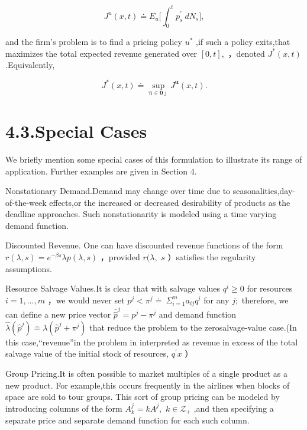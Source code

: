 \[
J ^ { u } ( x , t ) \doteq E _ { u } \biggl [ \int _ { 0 } ^ { t } p _ { s } ^ { \prime } \ d N _ { s } \biggl ] ,
\]

and the firm's problem is to find a pricing policy \(u ^ { * }\) ,if
such a policy exits,that maximizes the total expected revenue generated
over \([ 0 , t ] ,\) ，denoted \(J ^ { * } ( x , t )\) .Equivalently,

\[
J ^ { * } ( x , t ) \doteq \operatorname* { s u p } _ { \boldsymbol { \pi } \in \boldsymbol { 0 } \boldsymbol { \jmath } } J ^ { \boldsymbol { u } } ( x , t ) .
\]

\section{4.3.Special Cases}\label{special-cases}

We briefly mention some special cases of this formulation to illustrate
its range of application. Further examples are given in Section 4.

Nonstationary Demand.Demand may change over time due to
seasonalities,day-of-the-week effects,or the increased or decreased
desirability of products as the deadline approaches. Such
nonstationarity is modeled using a time varying demand function.

Discounted Revenue. One can have discounted revenue functions of the
form \(r ( \lambda , s ) = e ^ { - \beta s } \lambda p ( \lambda , s )\)
，provided \(r ( \lambda ,\) \(s \dot { }\) ）satisfies the regularity
assumptions.

Resource Salvage Values.It is clear that with salvage values
\(q ^ { i } \geqslant 0\) for resources \(i = 1 , \ldots , m\) ，we
would never set
\(p ^ { j } < \pi ^ { j } \doteq \ \Sigma _ { i = 1 } ^ { m } a _ { i j } q ^ { i }\)
for any \(j ;\) therefore, we can define a new price vector
\(\bar { \hat { p } } ^ { j } = p ^ { j } - \pi ^ { j }\) and demand
function
\(\hat { \lambda } ( \hat { p } ^ { j } ) \stackrel { - } { = } \lambda ( \hat { p } ^ { j } + \pi ^ { j } )\)
that reduce the problem to the zerosalvage-value case.(In this
case,``revenue''in the problem in interpreted as revenue in excess of
the total salvage value of the initial stock of resources,
\(q ^ { \prime } x\) ）

Group Pricing.It is often possible to market multiples of a single
product as a new product. For example,this occurs frequently in the
airlines when blocks of space are sold to tour groups. This sort of
group pricing can be modeled by introducing columns of the form
\(A _ { k } ^ { j } = k A ^ { j } ,\) \(k \in \mathcal { Z } _ { + }\)
,and then specifying a separate price and separate demand function for
each such column.

